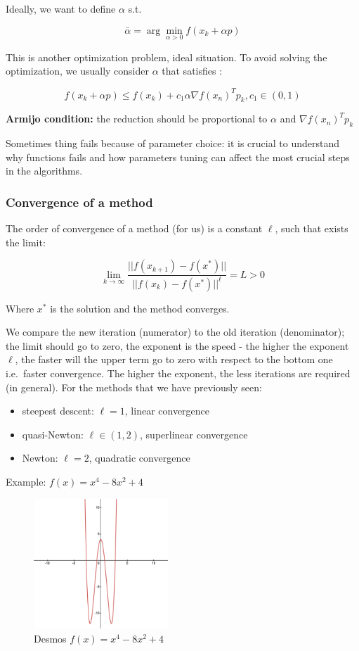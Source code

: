 Ideally, we want to define $\alpha$ s.t.

$$
\bar{\alpha}= \arg \min_{\alpha>0} f(x_k+\alpha p)
$$

This is another optimization problem, ideal situation. To avoid solving
the optimization, we usually consider $\alpha$ that satisfies :

$$
f(x_k+\alpha p) \leq f(x_k) + c_1\alpha \nabla f(x_n)^T p_k, c_1 \in (0,1)
$$

\textbf{Armijo condition:} the reduction should be proportional to
$\alpha$ and $\nabla f(x_n)^T p_k$

Sometimes thing fails because of parameter choice: it is crucial to
understand why functions fails and how parameters tuning can affect the
most crucial steps in the algorithms.

\hypertarget{convergence-of-a-method}{%
\subsubsection{Convergence of a method}\label{convergence-of-a-method}}

The order of convergence of a method (for us) is a constant $\ell$, such
that exists the limit:

$$
\lim_{k \rightarrow \infty  }\frac{||f(x_{k+1})-f(x^*)||}{||f(x_{k})-f(x^*)||^\ell} = L >0
$$

Where $x^*$ is the solution and the method converges.

We compare the new iteration (numerator) to the old iteration
(denominator); the limit should go to zero, the exponent is the speed -
the higher the exponent $\ell$, the faster will the upper term go to
zero with respect to the bottom one i.e.~faster convergence. The higher
the exponent, the less iterations are required (in general). For the
methods that we have previously seen:

\begin{itemize}
\tightlist
\item
  steepest descent: $\ell=1$, linear convergence
\item
  quasi-Newton: $\ell \in (1,2)$, superlinear convergence
\item
  Newton: $\ell=2$, quadratic convergence
\end{itemize}

Example: $f(x)=x^4-8x^2+4$

\begin{figure}
\centering
\includegraphics[width=0.45\textwidth]{function.png}
\caption{Desmos  $f(x)=x^4-8x^2+4$}
\end{figure}

